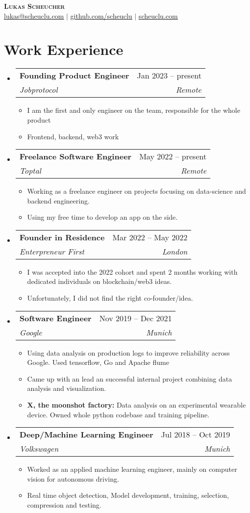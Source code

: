 \documentclass[letterpaper,11pt]{article}
\makeatletter
\newcommand{\resumeItem}[1]{
  \item\small{
    {#1 \vspace{-2pt}}
  }
}
\newcommand{\resumeSubheading}[4]{
  \vspace{-2pt}\item
    \begin{tabular*}{0.97\textwidth}[t]{l@{\extracolsep{\fill}}r}
      \textbf{#1} & #2 \\
      \textit{\small#3} & \textit{\small #4} \\
    \end{tabular*}\vspace{-7pt}
}
\newcommand{\resumeSubHeadingListStart}{\begin{itemize}[leftmargin=0.15in, label={}]}
\newcommand{\resumeSubHeadingListEnd}{\end{itemize}}
\newcommand{\resumeItemListStart}{\begin{itemize}}
\newcommand{\resumeItemListEnd}{\end{itemize}\vspace{-5pt}}
\makeatother
\begin{document}
\begin{center}
    \textbf{\Huge \scshape Lukas Scheucher} \\ \vspace{1pt}
    \href{mailto:lukas@scheuclu.com}{\underline{lukas@scheuclu.com}} $|$
    \href{https://github.com/scheuclu}{\underline{github.com/scheuclu}} $|$
    \href{https://scheuclu.com}{\underline{scheuclu.com}}
\end{center}




\section{Work Experience}
  \resumeSubHeadingListStart
    \resumeSubheading
      {Founding Product Engineer}{Jan 2023 -- present}
      {Jobprotocol}{Remote}
    \resumeItemListStart
      \resumeItem{I am the first and only engineer on the team, responsible for the whole product}
      \resumeItem{Frontend, backend, web3 work}
    \resumeItemListEnd
    \resumeSubheading
      {Freelance Software Engineer }{May 2022 -- present}
      {Toptal}{Remote}
    \resumeItemListStart
      \resumeItem{Working as a freelance engineer on projects focusing on data-science and backend engineering.}
      \resumeItem{Using my free time to develop an app on the side.}
    \resumeItemListEnd
    \resumeSubheading
      {Founder in Residence }{Mar 2022 -- May 2022}
      {Enterpreneur First}{London}
    \resumeItemListStart
      \resumeItem{I was accepted into the 2022 cohort and spent 2 months working with dedicated individuals on blockchain/web3 ideas.}
      \resumeItem{Unfortunately, I did not find the right co-founder/idea.}
    \resumeItemListEnd
    \resumeSubheading
      {Software Engineer }{Nov 2019 -- Dec 2021}
      {Google}{Munich}
    \resumeItemListStart
      \resumeItem{Using data analysis on production logs to improve reliability across Google. Used tensorflow, Go and Apache flume}
      \resumeItem{Came up with an lead an successful internal project combining data analysis and visualization.}
      \resumeItem{ \textbf{X, the moonshot factory:} Data analysis on an experimental wearable device. Owned whole python codebase and training pipeline.}
    \resumeItemListEnd
    \resumeSubheading
      {Deep/Machine Learning Engineer }{Jul 2018 -- Oct 2019}
      {Volkswagen}{Munich}
    \resumeItemListStart
      \resumeItem{Worked as an applied machine learning engineer, mainly on computer vision for autonomous driving.}
      \resumeItem{Real time object detection, Model development, training, selection, compression and testing.}
    \resumeItemListEnd
  \resumeSubHeadingListEnd
\end{document}
